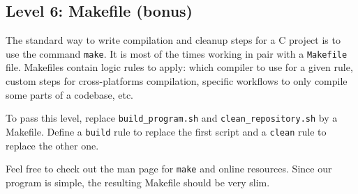 \documentclass[12pt]{article}
\begin{document}
\subsection{Level 6: Makefile (bonus)}

The standard way to write compilation and cleanup steps for a C project is to use the command \texttt{make}. It is most of the times working in pair with a \texttt{Makefile} file. Makefiles contain logic rules to apply: which compiler to use for a given rule, custom steps for cross-platforms compilation, specific workflows to only compile some parts of a codebase, etc.

To pass this level, replace \texttt{build\_program.sh} and \texttt{clean\_repository.sh} by a Makefile. Define a \texttt{build} rule to replace the first script and a \texttt{clean} rule to replace the other one.

Feel free to check out the man page for \texttt{make} and online resources. Since our program is simple, the resulting Makefile should be very slim.
\end{document}
